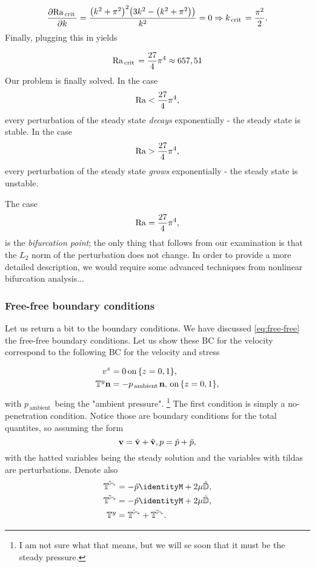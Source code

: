 \documentclass[../main.tex]{subfiles}
\begin{document}
\[
	\pdv{\mathrm{Ra}_{\, \text{crit} \,}}{k} = \frac{\qty(k^{2}+\pi^{2})^{2}\qty(3k^{2}-\qty(k^{2}+\pi^{2}))}{k^{2}} = 0 \Rightarrow k_{\, \text{crit} \,} = \frac{\pi^{2}}{2}.
\]
Finally, plugging this in yields

\begin{equation}
    \label{eq:Rayileigh_crit}
    \mathrm{Ra}_{\, \text{crit} \,} = \frac{27}{4}\pi^4 \approx 657,51
\end{equation}
Our problem is finally solved. In the case 
\[
	\mathrm{Ra} < \frac{27}{4}\pi^4,
\]
every perturbation of the steady state \textit{decays} exponentially - the steady state is stable. In the case
\[
	\mathrm{Ra} > \frac{27}{4}\pi^4,
\]
every perturbation of the steady state \textit{grows} exponentially - the steady state is unstable.

The case
\[
	\mathrm{Ra} = \frac{27}{4} \pi^4,
\]
is the \textit{bifurcation point}; the only thing that follows from our examination is that the $L_2$ norm of the perturbation does not change. In order to provide a more detailed description, we would require some advanced techniques from nonlinear bifurcation analysis...

\subsubsection{Free-free boundary conditions}
\label{sec:free_free}
Let us return a bit to the boundary conditions. We have discussed \ref{eq:free-free} the free-free boundary conditions. Let us show these BC for the velocity correspond to the following BC for the velocity and stress

\begin{align*}
	v^z &= 0 \, \text{on} \,\{z = 0,1 \},\\
	\mathbb{T}^y \vb{n} &= - p_{\, \text{ambient} \,} \vb{n},\, \text{on} \, \{z = 0,1\},
\end{align*}
with $p_{\, \text{ambient} \,}$ being the "ambient pressure". \footnote{I am not sure what that means, but we will se soon that it must be the steady pressure.} The first condition is simply a no-penetration condition. Notice those are boundary conditions for the total quantites, so assuming the form
\[
	\vb{v} = \hat{\vb{v}} + \tilde{\vb{v}}, p = \hat{p} + \tilde{p},
\]
with the hatted variables being the steady solution and the variables with tildas are perturbations. Denote also
\begin{align*}
	\hat{\cstress} &= -\hat{p}\identityM + 2 \mu \hat{\symvgrad}, \\
	\tilde{\cstress} &= -\tilde{p}\identityM + 2 \mu \tilde{\symvgrad}, \\
	\cstress &= \hat{\cstress} + \tilde{\cstress}.
\end{align*}
\end{document}
